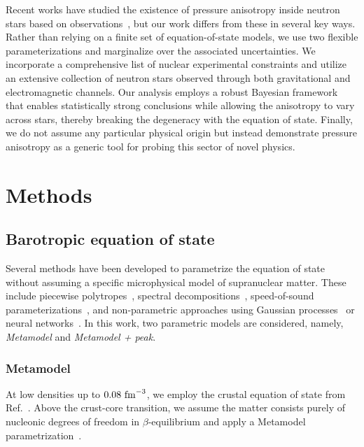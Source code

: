 \documentclass[prd,twocolumn,a4paper,floatfix,nofootinbib,preprintnumbers,superscriptaddress]{revtex4-1}
\begin{document}
Recent works have studied the existence of pressure anisotropy inside neutron stars based on observations~\cite{Biswas:2019gkw,daSilva:2024qex,Yang:2024bre,Liu:2025cwy}, but our work differs from these in several key ways. Rather than relying on a finite set of equation-of-state models, we use two flexible parameterizations and marginalize over the associated uncertainties. We incorporate a comprehensive list of nuclear experimental constraints and utilize an extensive collection of neutron stars observed through both gravitational and electromagnetic channels. Our analysis employs a robust Bayesian framework that enables statistically strong conclusions while allowing the anisotropy to vary across stars, thereby breaking the degeneracy with the equation of state. Finally, we do not assume any particular physical origin but instead demonstrate pressure anisotropy as a generic tool for probing this sector of novel physics.

\section{Methods}
\label{sec:methods}
\subsection{Barotropic equation of state}
\label{sec:EOS}

Several methods have been developed to parametrize the equation of state without assuming a specific microphysical model of supranuclear matter. These include piecewise polytropes~\cite{Read:2008iy,Steiner:2010fz,Hebeler:2013nza,Raithel:2016bux,OBoyle:2020qvf}, spectral decompositions~\cite{Lindblom:2010bb,Lindblom:2012zi,Lindblom:2018rfr,Fasano:2019zwm,Lindblom:2022mkr}, speed-of-sound parameterizations~\cite{Tews:2018iwm,Greif:2018njt}, and non-parametric approaches using Gaussian processes~\cite{Landry:2018prl,Essick:2019ldf,Landry:2020vaw} or neural networks~\cite{Han:2021kjx,Li:2025obt}. In this work, two parametric models are considered, namely, \textit{Metamodel} and \textit{Metamodel + peak}.
\subsubsection{Metamodel} 
At low densities up to $0.08 \ {\rm fm}^{-3}$, we employ the crustal equation of state from Ref.~\cite{Douchin:2001sv}. Above the crust-core transition, we assume the matter consists purely of nucleonic degrees of freedom in $\beta$-equilibrium and apply a Metamodel parametrization~\cite{Margueron:2017eqc, Margueron:2017lup, Somasundaram:2020chb}.
\end{document}
